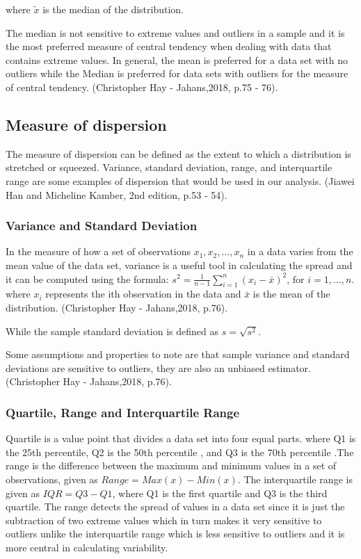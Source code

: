 \documentclass[12 pt]{scrartcl}
\begin{document}
 where $\tilde{x}$ is the median of the distribution.
 
The median is not sensitive to extreme values and outliers in a sample and it is the most preferred measure of central tendency when dealing with data that contains extreme values. 
In general, the mean is preferred for a data set with no outliers while the Median is preferred for data sets with outliers for the measure of central tendency. (Christopher Hay - Jahans,2018, p.75 - 76).
 
 
\subsection{Measure of dispersion}

The measure of dispersion can be defined as the extent to which a distribution is stretched or squeezed. Variance, standard deviation, range, and interquartile range are some examples of dispersion that would be used in our analysis. (Jiawei Han and Micheline Kamber, 2nd edition, p.53 - 54).

\subsubsection{Variance and Standard Deviation}

In the measure of how a set of observations $x_1, x_2, \ldots, x_n$ in a data varies from the mean value of the data set, variance is a useful tool in calculating the spread and it can be computed using the formula: $s^2 = \frac{1}{n-1} \sum_{i=1}^n (x_i - \bar{x})^2$,  $\text{for }i=1,\ldots, n$. where $x_i$ represents the ith observation in the data and  $\bar{x}$ is the mean of the distribution. (Christopher Hay - Jahans,2018, p.76).


While the sample standard deviation is defined as $s = \sqrt{s^2}$.

Some assumptions and properties to note are that sample variance and standard deviations are sensitive to outliers, they are also an unbiased estimator. (Christopher Hay - Jahans,2018, p.76).



\subsubsection{Quartile, Range and Interquartile Range}

Quartile is a value point that divides a data set into four equal parts. where Q1 is the 25th percentile, Q2 is the 50th percentile ,  and Q3 is the 70th percentile .The range is the difference between the maximum and minimum values in a set of observations, given as $Range = Max(x) - Min(x)$. The interquartile range is given as $IQR = Q3 - Q1$, where Q1 is the first quartile and Q3 is the third quartile. The range detects the spread of values in a data set since it is just the subtraction of two extreme values which in turn makes it very sensitive to outliers unlike the interquartile range which is less sensitive to outliers and it is more central in calculating variability.
\end{document}
